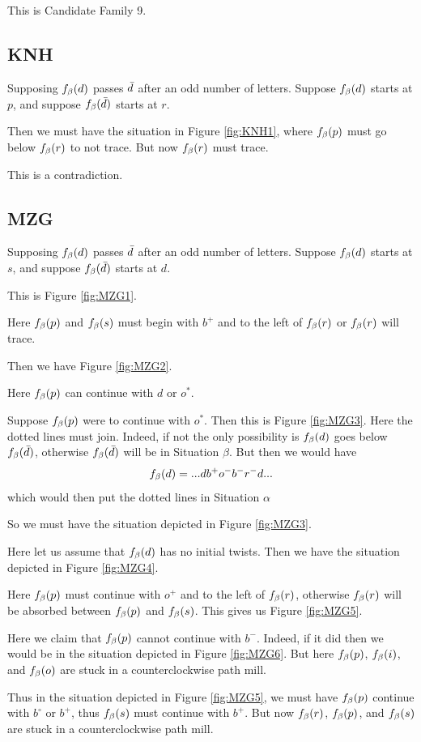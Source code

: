 This is Candidate Family 9.

\subsection{KNH}\label{KNH}
Supposing $f_\beta(d)$ passes $\bar{d}$ after an odd number of letters. Suppose $f_\beta(d)$ starts at $p$, and suppose $f_\beta(\bar{d})$ starts at $r$.

Then we must have the situation in Figure \ref{fig:KNH1}, where $f_\beta(p)$ must go below $f_\beta(r)$ to not trace. But now $f_\beta(r)$ must trace.

This is a contradiction.

\subsection{MZG}\label{MZG}
Supposing $f_\beta(d)$ passes $\bar{d}$ after an odd number of letters. Suppose $f_\beta(d)$ starts at $s$, and suppose $f_\beta(\bar{d})$ starts at $d$.

This is Figure \ref{fig:MZG1}. 

Here $f_\beta(p)$ and $f_\beta(s)$ must begin with $b^+$ and to the left of $f_\beta(r)$ or $f_\beta(r)$ will trace.

Then we have Figure \ref{fig:MZG2}.

Here $f_\beta(p)$ can continue with $d$ or $o^*$.

Suppose $f_\beta(p)$ were to continue with $o^*$. Then this is Figure \ref{fig:MZG3}. Here the dotted lines must join. Indeed, if not the only possibility is $f_\beta(d)$ goes below $f_\beta(\bar{d})$, otherwise $f_\beta(\bar{d})$ will be in Situation $\beta$. But then we would have
\[
f_\beta(d) = ... d b^+ o^- b^- r^- d...
\]
which would then put the dotted lines in Situation $\alpha$

So we must have the situation depicted in Figure \ref{fig:MZG3}.

Here let us assume that $f_\beta(d)$ has no initial twists. Then we have the situation depicted in Figure \ref{fig:MZG4}.

Here $f_\beta(p)$ must continue with $o^+$ and to the left of $f_\beta(r)$, otherwise $f_\beta(r)$ will be absorbed between $f_\beta(p)$ and $f_\beta(s)$. This gives us Figure \ref{fig:MZG5}.

Here we claim that $f_\beta(p)$ cannot continue with $b^-$. Indeed, if it did then we would be in the situation depicted in Figure \ref{fig:MZG6}. But here $f_\beta(p)$, $f_\beta(i)$, and $f_\beta(o)$ are stuck in a counterclockwise path mill.

Thus in the situation depicted in Figure \ref{fig:MZG5}, we must have $f_\beta(p)$ continue with $b^\circ$ or $b^+$, thus $f_\beta(s)$ must continue with $b^+$. But now $f_\beta(r)$, $f_\beta(p)$, and $f_\beta(s)$ are stuck in a counterclockwise path mill.


